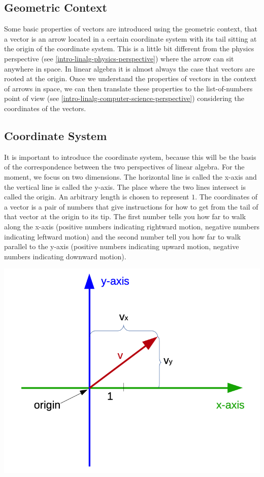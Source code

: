 \documentclass[]{book}
\theoremstyle{definition}
\theoremstyle{definition}
\theoremstyle{definition}
\theoremstyle{remark}
\begin{document}
\hypertarget{intro-linalg-geometric-context}{%
\subsection{Geometric Context}\label{intro-linalg-geometric-context}}

Some basic properties of vectors are introduced using the geometric context, that a vector is an arrow located in a certain coordinate system with its tail sitting at the origin of the coordinate system. This is a little bit different from the physics perspective (see \ref{intro-linalg-physics-perspective}) where the arrow can sit anywhere in space. In linear algebra it is almost always the case that vectors are rooted at the origin. Once we understand the properties of vectors in the context of arrows in space, we can then translate these properties to the list-of-numbers point of view (see \ref{intro-linalg-computer-science-perspective}) considering the coordinates of the vectors.

\hypertarget{intro-linalg-coordinate-system}{%
\subsection{Coordinate System}\label{intro-linalg-coordinate-system}}

It is important to introduce the coordinate system, because this will be the basis of the correspondence between the two perspectives of linear algebra. For the moment, we focus on two dimensions. The horizontal line is called the x-axis and the vertical line is called the y-axis. The place where the two lines intersect is called the origin. An arbitrary length is chosen to represent \(1\). The coordinates of a vector is a pair of numbers that give instructions for how to get from the tail of that vector at the origin to its tip. The first number tells you how far to walk along the x-axis (positive numbers indicating rightward motion, negative numbers indicating leftward motion) and the second number tell you how far to walk parallel to the y-axis (positive numbers indicating upward motion, negative numbers indicating downward motion).

\includegraphics{odg/coordinate-system.png}
\end{document}
